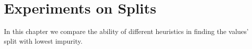 \newpage

\chapter{Experiments on Splits}
\label{chap:experimentssplits}

In this chapter we compare the ability of different heuristics in finding the values' split with lowest impurity.
